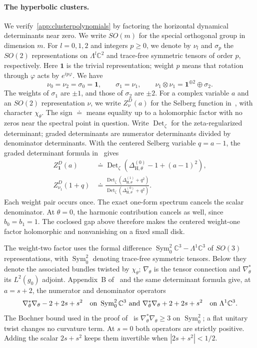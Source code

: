 \documentclass[11pt,letterpaper,reqno]{amsart}
\theoremstyle{remark}
\newcommand{\Det}{\operatorname{Det}}
\begin{document}
\paragraph{The hyperbolic clusters.}
We verify~\eqref{app:clusterpolynomials} by factoring the horizontal
dynamical determinants near zero.
We write $SO(m)$ for the special orthogonal group in dimension $m$.
For $l=0,1,2$ and integers $p\geq0$, we denote by $\nu_l$ and $\sigma_p$
the $SO(2)$ representations on
$\Lambda^l\mathbb C^2$ and trace-free symmetric tensors of order
$p$, respectively.
Here $\mathbf1$ is the trivial representation; weight $p$ means that
rotation through $\varphi$ acts by $e^{ip\varphi}$.
We have
\[
 \nu_0=\nu_2=\sigma_0=\mathbf1,\qquad
 \sigma_1=\nu_1,\qquad
 \nu_1\otimes\nu_1=\mathbf1^{\oplus2}\oplus\sigma_2.
\]
The weights of $\sigma_1$ are $\pm1$, and those of $\sigma_2$ are $\pm2$.
For a complex variable $a$ and an $SO(2)$ representation $\nu$, we write
$Z^D_\nu(a)$ for the Selberg function in~\cite{DGRS}, with character
$\chi_\theta$. The sign $\doteq$ means equality up to a holomorphic
factor with no zeros near the spectral point in question.
Write $\Det_\zeta$ for the zeta-regularized determinant; graded
determinants are numerator determinants divided by denominator determinants.
With the centered Selberg variable $q=a-1$, the graded determinant
formula in~\cite[Proposition~4.7]{BO} gives
\begin{align}\label{app:determinants}
 Z^D_{\mathbf1}(a)&\doteq
 \Det_\zeta(\Delta_{\mathrm H,\theta}^{(0)}-1+(a-1)^2),\\
 Z^D_{\nu_1}(1+q)&\doteq
 \frac{\Det_\zeta(\Delta_{\mathrm H,\theta}^{(1)}+q^2)}
      {\Det_\zeta(\Delta_{\mathrm H,\theta}^{(0)}+q^2)}.
\end{align}
Each weight pair occurs once.
The exact one-form spectrum cancels the scalar denominator.
At $\theta=0$, the harmonic contribution cancels as well, since
$b_0=b_1=1$.
The coclosed gap above therefore makes the centered weight-one
factor holomorphic and nonvanishing on a fixed small disk.

The weight-two factor uses the formal difference
$\operatorname{Sym}^2_0\mathbb C^3-\Lambda^1\mathbb C^3$ of $SO(3)$
representations, with $\operatorname{Sym}^2_0$ denoting trace-free symmetric
tensors. Below they denote the associated bundles twisted by $\chi_\theta$;
$\nabla_\theta$ is the tensor connection and $\nabla_\theta^*$ its $L^2(g_0)$ adjoint.
Appendix~B of~\cite{DGRS} and the same determinant formula give, at $a=s+2$,
the numerator and denominator operators
\[
 \begin{gathered}
 \nabla_\theta^*\nabla_\theta-2+2s+s^2
       \quad\hbox{on }\operatorname{Sym}^2_0\mathbb C^3 \text{ and }
 \nabla_\theta^*\nabla_\theta+2+2s+s^2
       \quad\hbox{on }\Lambda^1\mathbb C^3.
 \end{gathered}
\]
The Bochner bound used in the proof of~\cite[Proposition~7.7]{DGRS} is
$\nabla_\theta^*\nabla_\theta\ge3$ on $\operatorname{Sym}^2_0$;
a flat unitary twist changes no curvature term.
At $s=0$ both operators are strictly positive. Adding the scalar
$2s+s^2$ keeps them invertible when $|2s+s^2|<1/2$.
\end{document}
